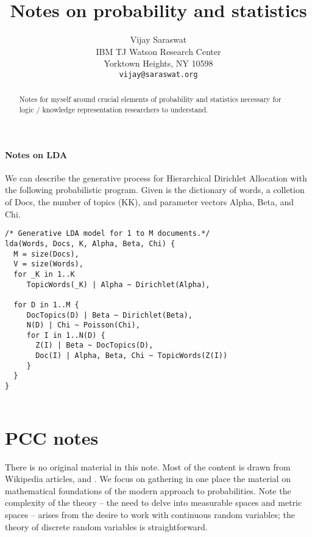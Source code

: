 \documentclass{article}
\title{Notes on probability and statistics}
\author{
  Vijay Saraswat \\
  IBM TJ Watson Research Center \\
  Yorktown Heights, NY 10598\\
  \texttt{vijay@saraswat.org} 
}
\theoremstyle{definition}
\begin{document}

\maketitle
\begin{abstract}
  Notes for myself around crucial elements of probability and statistics necessary for logic / knowledge representation researchers to understand. 
\end{abstract}



\paragraph{Notes on LDA}

We can describe the generative process for Hierarchical Dirichlet Allocation with the following probabilistic program. Given is the dictionary of words, a colletion of Docs, the number of topics (KK), and parameter vectors Alpha, Beta, and Chi.  

\begin{lstlisting}
/* Generative LDA model for 1 to M documents.*/
lda(Words, Docs, K, Alpha, Beta, Chi) {
  M = size(Docs),
  V = size(Words),
  for _K in 1..K
     TopicWords(_K) | Alpha ~ Dirichlet(Alpha),

  for D in 1..M {
     DocTopics(D) | Beta ~ Dirichlet(Beta),
     N(D) | Chi ~ Poisson(Chi),
     for I in 1..N(D) {
       Z(I) | Beta ~ DocTopics(D),
       Doc(I) | Alpha, Beta, Chi ~ TopicWords(Z(I))
     }
  }
}
  
\end{lstlisting}



\section{PCC notes}

There is no original material in this note. Most of the content is drawn from Wikipedia articles, \cite{lawler} and \cite{pgm-book}. We focus on gathering in one place the material on mathematical foundations of the modern approach to probabilities. Note the complexity of the theory -- the need to delve into measurable spaces and metric spaces --  arises from the desire to work with continuous random variables; the theory of discrete random variables is straightforward.
\end{document}
